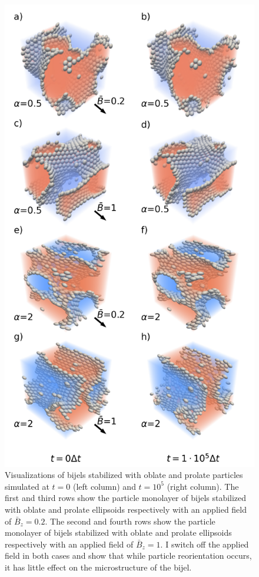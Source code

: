 \begin{figure} 
\centering 
\includegraphics[scale=0.4]{../figures/results/paper2/microstructure_viz-field_down.png} 
\caption{Visualizations of bijels stabilized with oblate and prolate particles simulated at $t = 0$ (left column) and $t = 10^5$ (right column). 
         The first and third rows show the particle monolayer of bijels stabilized with oblate and prolate ellipsoids respectively with an applied 
         field of $\bar{B}_z = 0.2$. The second and fourth rows show the particle monolayer of bijels stabilized with oblate and prolate ellipsoids 
         respectively with an applied field of $\bar{B}_z = 1$. I switch off the applied field in both cases and show that while particle reorientation 
         occurs, it has little effect on the microstructure of the bijel.}
\label{fig:microstructure_viz-field_down}
\end{figure}


